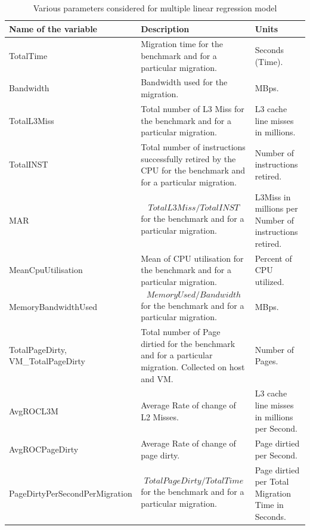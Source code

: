\documentclass[a4paper,10pt,twoside]{article}
\begin{document}
\begin{table}[ht]
\caption{Various parameters considered for multiple linear regression model}
\begin{center}
    \begin{tabular}{ | l | | p{5cm} | p{5cm} |}
    \hline
    Name of the variable &  Description & Units \\ \hline
    TotalTime & Migration time for the benchmark and for a particular migration. & Seconds (Time). \\ \hline
    Bandwidth & Bandwidth used for the migration. & MBps.\\ \hline 
    TotalL3Miss & Total number of L3 Miss for the benchmark and for a particular migration. & L3 cache line misses in millions. \\ \hline
    TotalINST & Total number of instructions successfully retired by the CPU for  the benchmark and for a particular migration. & Number of instructions retired.\\ \hline
   MAR \cite{poellabauer2005feedback} &  \begin{equation}  TotalL3Miss/TotalINST  \end{equation} for the benchmark and for a particular migration. & L3Miss in millions per Number of instructions retired. \\ \hline
   MeanCpuUtilisation & Mean of CPU utilisation for the benchmark and for a particular migration. & Percent of CPU utilized. \\ \hline
   MemoryBandwidthUsed & \begin{equation}  Memory Used / Bandwidth  \end{equation} for the benchmark and for a particular migration. & MBps. \\ \hline
   TotalPageDirty, VM\_TotalPageDirty & Total number of Page dirtied for the benchmark and for a particular migration. Collected on host and VM. & Number of Pages. \\ \hline
  AvgROCL3M & Average Rate of change of L2 Misses. & L3 cache line misses in millions per Second. \\ \hline
  AvgROCPageDirty & Average Rate of change of page dirty. & Page dirtied per Second. \\ \hline
  PageDirtyPerSecondPerMigration & \begin{equation}  TotalPageDirty / TotalTime  \end{equation} for the benchmark and for a particular migration. & Page dirtied per Total Migration Time in Seconds. \\ \hline
    \end{tabular}
\end{center}
\label{tab:gt}
\end{table}
\end{document}
